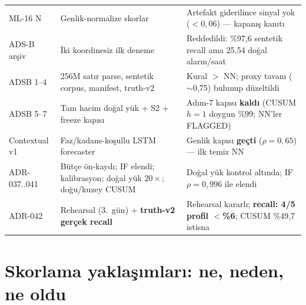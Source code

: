 \documentclass[11pt,a4paper]{article}
\newcommand{\gatefail}[1]{\textcolor{failred}{\textbf{#1}}}
\newcommand{\gatepass}[1]{\textcolor{okgreen}{\textbf{#1}}}
\begin{document}
\begin{small}
\begin{longtable}{@{}p{}p{}p{}@{}}
ML-16 N & Genlik-normalize skorlar & Artefakt giderilince sinyal yok ($<0{,}06$) --- kapanış kanıtı \\
ADS-B arşiv & İki koordinesiz ilk deneme & Reddedildi: \%97{,}6 sentetik recall ama 25{,}54 doğal alarm/saat \\
ADSB 1--4 & 256M satır parse, sentetik corpus, manifest, truth-v2 & Kural $>$ NN; proxy tavanı ($\sim$0{,}75) bulunup düzeltildi \\
ADSB 5--7 & Tam hacim doğal yük + S2 + freeze kapısı & Adım-7 kapısı \gatefail{kaldı} (CUSUM $h{=}1$ doygun \%99; NN'ler FLAGGED) \\
Contextual v1 & Faz/kadans-koşullu LSTM forecaster & Genlik kapısı \gatepass{geçti} ($\rho=0{,}65$) --- ilk temiz NN \\
ADR-037..041 & Bütçe ön-kaydı; IF elendi; kalibrasyon; doğal yük $20\times$; doğu/kuzey CUSUM & Doğal yük kontrol altında; IF $\rho=0{,}996$ ile elendi \\
ADR-042 & Rehearsal (3.\ gün) + \textbf{truth-v2 gerçek recall} & Rehearsal kararlı; \gatefail{recall: 4/5 profil $<$\%6}; CUSUM \%49{,}7 istisna \\
\bottomrule
\end{longtable}
\end{small}

\section{Skorlama yaklaşımları: ne, neden, ne oldu}
\end{document}
